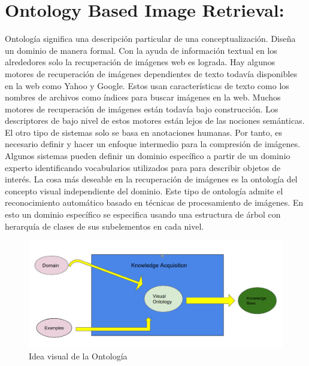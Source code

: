 \documentclass{llncs}
\begin{document}
\section{Ontology Based Image Retrieval:}
Ontolog\'ia significa una descripci\'on particular de una conceptualizaci\'on. Dise\~{n}a un dominio de manera formal. Con la ayuda 
de informaci\'on textual en los alrededores solo la recuperaci\'on de im\'agenes web es lograda. Hay algunos motores de recuperaci\'on 
de im\'agenes dependientes de texto todav\'ia disponibles en la web como Yahoo y Google. Estos usan caracter\'isticas de texto como 
los nombres de archivos como \'indices para buscar im\'agenes en la web. Muchos motores de recuperaci\'on de im\'agenes est\'an todav\'ia 
bajo construcci\'on. Los descriptores de bajo nivel de estos motores est\'an lejos de las nociones sem\'anticas. El otro tipo de sistemas
solo se basa en anotaciones humanas. Por tanto, es necesario definir y hacer un enfoque intermedio para la compresi\'on de im\'agenes. 
Algunos sistemas pueden definir un dominio espec\'ifico a partir de un dominio experto  identificando vocabularios utilizados para 
para describir objetos de inter\'es. La cosa m\'as deseable en la recuperaci\'on de im\'agenes es la ontolog\'ia del concepto visual 
independiente del dominio. Este tipo de ontolog\'ia admite el reconocimiento autom\'atico basado en t\'ecnicas de procesamiento de 
im\'agenes.  En esto un dominio espec\'ifico se especifica usando una estructura de \'arbol con herarqu\'ia de clases de sus subelementos 
en cada nivel.

\begin{figure}
    \caption{Idea visual de la Ontolog\'ia}
    \includegraphics[scale = .3]{./images/visual_idea_ontology.png}
\end{figure}

\noindent
\end{document}
